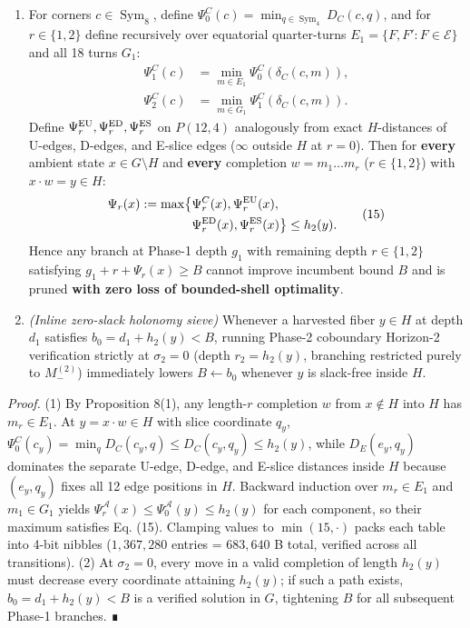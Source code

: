 \documentclass[10pt,twocolumn,letterpaper]{article}
\providecommand{\tightlist}{\setlength{\itemsep}{0pt}\setlength{\parskip}{0pt}}
\begin{document}
\begin{enumerate}
\def\labelenumi{\arabic{enumi}.}
\tightlist
\item
  For corners \(c \in \operatorname{Sym}_8\), define
  \(\Psi_0^C(c) = \min_{q \in \operatorname{Sym}_4} D_C(c, q)\), and for
  \(r \in \{1, 2\}\) define recursively over equatorial quarter-turns
  \(E_1 = \{F, F' : F \in \mathcal E\}\) and all 18 turns \(G_1\): \[
  \begin{aligned}
  \Psi_1^C(c) &= \min_{m \in E_1} \Psi_0^C(\delta_C(c, m)),\\
  \Psi_2^C(c) &= \min_{m \in G_1} \Psi_1^C(\delta_C(c, m)).
  \end{aligned}
  \tag{14}
  \] Define \(\Psi_r^{\rm EU}, \Psi_r^{\rm ED}, \Psi_r^{\rm ES}\) on
  \(P(12,4)\) analogously from exact \(H\)-distances of U-edges,
  D-edges, and E-slice edges (\(\infty\) outside \(H\) at \(r=0\)). Then
  for \textbf{every} ambient state \(x \in G \setminus H\) and
  \textbf{every} completion \(w = m_1 \dots m_r\) (\(r \in \{1,2\}\))
  with \(x \cdot w = y \in H\): \[
  \begin{aligned}
  \Psi_r(x) := \max\bigl\{&\Psi_r^C(x), \Psi_r^{\rm EU}(x),\\
  &\Psi_r^{\rm ED}(x), \Psi_r^{\rm ES}(x)\bigr\} \le h_2(y).
  \end{aligned}
  \tag{15}
  \] Hence any branch at Phase-1 depth \(g_1\) with remaining depth
  \(r \in \{1,2\}\) satisfying \(g_1 + r + \Psi_r(x) \ge B\) cannot
  improve incumbent bound \(B\) and is pruned \textbf{with zero loss of
  bounded-shell optimality}.
\item
  \emph{(Inline zero-slack holonomy sieve)} Whenever a harvested fiber
  \(y \in H\) at depth \(d_1\) satisfies \(b_0 = d_1 + h_2(y) < B\),
  running Phase-2 coboundary Horizon-2 verification strictly at
  \(\sigma_2 = 0\) (depth \(r_2 = h_2(y)\), branching restricted purely
  to \(M_-^{(2)}\)) immediately lowers \(B \leftarrow b_0\) whenever
  \(y\) is slack-free inside \(H\).
\end{enumerate}

\emph{Proof.} (1) By Proposition 8(1), any length-\(r\) completion \(w\)
from \(x \notin H\) into \(H\) has \(m_r \in E_1\). At
\(y = x \cdot w \in H\) with slice coordinate \(q_y\),
\(\Psi_0^C(c_y) = \min_q D_C(c_y, q) \le D_C(c_y, q_y) \le h_2(y)\),
while \(D_E(e_y, q_y)\) dominates the separate U-edge, D-edge, and
E-slice distances inside \(H\) because \((e_y, q_y)\) fixes all 12 edge
positions in \(H\). Backward induction over \(m_r \in E_1\) and
\(m_1 \in G_1\) yields
\(\Psi_r^{\mathcal A}(x) \le \Psi_0^{\mathcal A}(y) \le h_2(y)\) for
each component, so their maximum satisfies Eq. (15). Clamping values to
\(\min(15, \cdot)\) packs each table into 4-bit nibbles (\(1,367,280\)
entries = \(683,640\) B total, verified across all transitions). (2) At
\(\sigma_2 = 0\), every move in a valid completion of length \(h_2(y)\)
must decrease every coordinate attaining \(h_2(y)\); if such a path
exists, \(b_0 = d_1 + h_2(y) < B\) is a verified solution in \(G\),
tightening \(B\) for all subsequent Phase-1 branches. ∎
\end{document}
